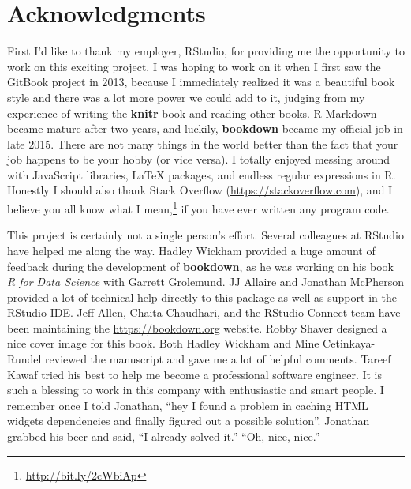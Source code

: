 \documentclass[
  10pt,
]{krantz}
\renewcommand{\href}[2]{#2\footnote{\url{#1}}}
\begin{document}
\section*{Acknowledgments}\label{acknowledgments}


First I'd like to thank my employer, RStudio, for providing me the opportunity to work on this exciting project. I was hoping to work on it when I first saw the GitBook project in 2013, because I immediately realized it was a beautiful book style and there was a lot more power we could add to it, judging from my experience of writing the \textbf{knitr} book \citep{xie2015} and reading other books. R Markdown became mature after two years, and luckily, \textbf{bookdown} became my official job in late 2015. There are not many things in the world better than the fact that your job happens to be your hobby (or vice versa). I totally enjoyed messing around with JavaScript libraries, LaTeX packages, and endless regular expressions in R. Honestly I should also thank Stack Overflow (\url{https://stackoverflow.com}), and I believe you all know \href{http://bit.ly/2cWbiAp}{what I mean,} if you have ever written any program code.

This project is certainly not a single person's effort. Several colleagues at RStudio have helped me along the way. Hadley Wickham provided a huge amount of feedback during the development of \textbf{bookdown}, as he was working on his book \emph{R for Data Science} with Garrett Grolemund. JJ Allaire and Jonathan McPherson provided a lot of technical help directly to this package as well as support in the RStudio IDE. Jeff Allen, Chaita Chaudhari, and the RStudio Connect team have been maintaining the \url{https://bookdown.org} website. Robby Shaver designed a nice cover image for this book. Both Hadley Wickham and Mine Cetinkaya-Rundel reviewed the manuscript and gave me a lot of helpful comments. Tareef Kawaf tried his best to help me become a professional software engineer. It is such a blessing to work in this company with enthusiastic and smart people. I remember once I told Jonathan, ``hey I found a problem in caching HTML widgets dependencies and finally figured out a possible solution''. Jonathan grabbed his beer and said, ``I already solved it.'' ``Oh, nice, nice.''
\end{document}

